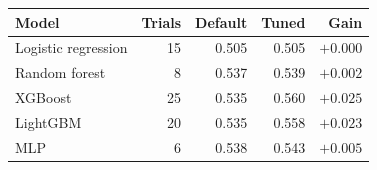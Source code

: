 \begin{tabular}{@{}lrrrr@{}}
\toprule
Model & Trials & Default & Tuned & Gain \\
\midrule
Logistic regression & 15 & 0.505 & 0.505 & $+0.000$ \\
Random forest & 8 & 0.537 & 0.539 & $+0.002$ \\
XGBoost & 25 & 0.535 & 0.560 & $+0.025$ \\
LightGBM & 20 & 0.535 & 0.558 & $+0.023$ \\
MLP & 6 & 0.538 & 0.543 & $+0.005$ \\
\bottomrule
\end{tabular}
